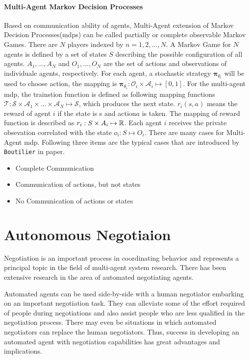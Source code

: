 \paragraph{Multi-Agent Markov Decision Processes} Based on communication ability of agents, Multi-Agent extension of Markov Decision Processes(\gls{mdps}) can be called partially or complete observable Markov Games. There are $N$ players indexed by $n=1,2, \dots ,N$. A Markov Game for $N$ agents is defined by a set of states $S$ describing the possible configuration of all agents. $A_1, \dots, A_N$ and $O_1, \dots, O_N$ are the set of actions and observations of individuale agents, respectively. For each agent, a stochastic strategy $\boldsymbol{\pi}_{\theta_{i}}$ will be used to choose action, the mapping is $\boldsymbol{\pi}_{\theta_{i}}: \mathcal{O}_{i} \times \mathcal{A}_{i} \mapsto[0,1]$. For the multi-agent \gls{mdp}, the trainstion function is defined as following mapping functions $\mathcal{T}: \mathcal{S} \times \mathcal{A}_{1} \times \ldots \times \mathcal{A}_{N} \mapsto \mathcal{S}$, which produces the next state. $r_i(s, a)$ means the reward of agent $i$ if the state is s and action$a$ is taken. The mapping of reward function is described as $r_i: S \times A_i \mapsto \mathbb{R}$. Each agent $i$ receives the private obsevation correlated with the state $o_i: S \mapsto O_i$\parencite{maddpg2017}. There are many cases for Multi-Agent \gls{mdp}. Following three items are the typical cases that are introduced by \texttt{Boutilier} in paper\parencite{Boutilier1996PlanningLA}.
\begin{itemize}
\item Complete Communication
\item Communication of actions, but not states 
\item No Communication of actions or states
\end{itemize}

\section{Autonomous Negotiaion} \label{autonomous-negotiation}
Negotiation is an important process in coordinating behavior and represents a principal topic in the field of multi-agent system research. There has been extensive research in the area of automated negotiating agents. 

Automated agents can be used side-by-side with a human negotiator embarking on an important negotiation task. They can alleviate some of the effort required of people during negotiations and also assist people who are less qualified in the negotiation process. There may even be situations in which automated negotiators can replace the human negotiators. Thus, success in developing an automated agent with negotiation capabilities has great advantages and implications\parencite{Baarslag2012}.

